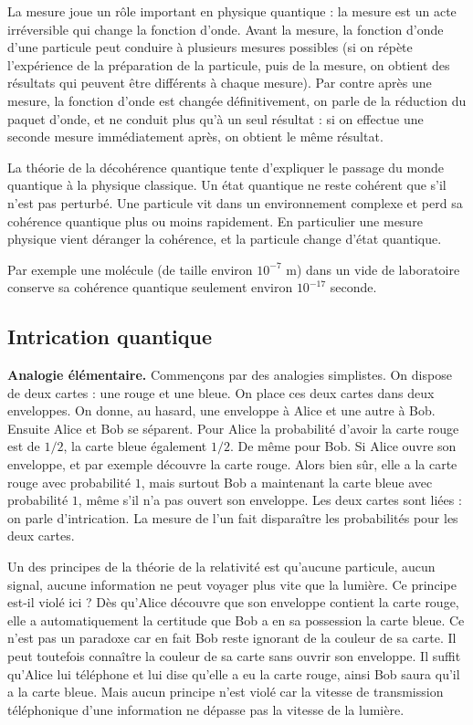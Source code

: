 \documentclass[11pt,class=report,crop=false]{standalone}
\begin{document}
La mesure joue un rôle important en physique quantique : la mesure est un acte irréversible qui change la fonction d'onde.
Avant la mesure, la fonction d'onde d'une particule peut conduire à plusieurs mesures possibles (si on répète l'expérience de la préparation de la particule, puis de la mesure, on obtient des résultats qui peuvent être différents à chaque mesure).
Par contre après une mesure, la fonction d'onde est changée définitivement, on parle de la \og{}réduction du paquet d'onde\fg{}, et ne conduit plus qu'à un seul résultat : si on effectue une seconde mesure immédiatement après, on obtient le même résultat.

La théorie de la décohérence quantique tente d'expliquer le passage du monde quantique à la physique classique.
Un état quantique ne reste \og{}cohérent\fg{} que s'il n'est pas perturbé. Une particule vit dans un environnement complexe et perd sa cohérence quantique plus ou moins rapidement. En particulier une mesure physique vient déranger la cohérence, et la particule change d'état quantique.

Par exemple une molécule (de taille environ $10^{-7}$ m) dans un vide de laboratoire conserve sa cohérence quantique seulement environ $10^{-17}$ seconde.


\subsection{Intrication quantique}


\textbf{Analogie élémentaire.}
Commençons par des analogies simplistes. On dispose de deux cartes : une rouge et une bleue. On place ces deux cartes dans deux enveloppes. On donne, au hasard, une enveloppe à Alice et une autre à Bob. Ensuite Alice et Bob se séparent. Pour Alice la probabilité d'avoir la carte rouge est de $1/2$, la carte bleue également $1/2$. De même pour Bob. Si Alice ouvre son enveloppe, et par exemple découvre la carte rouge. Alors bien sûr, elle a la carte rouge avec probabilité $1$, mais surtout Bob a maintenant la carte bleue avec probabilité $1$, même s'il n'a pas ouvert son enveloppe.
Les deux cartes sont liées : on parle d'intrication. La mesure de l'un fait disparaître les probabilités pour les deux cartes.

 
Un des principes de la théorie de la relativité est qu'aucune particule, aucun signal, aucune information ne peut voyager plus vite que la lumière. Ce principe est-il violé ici ? Dès qu'Alice découvre que son enveloppe contient la carte rouge, elle a automatiquement la certitude que Bob a en sa possession la carte bleue. Ce n'est pas un paradoxe car en fait Bob reste ignorant de la couleur de sa carte. Il peut toutefois connaître la couleur de sa carte sans ouvrir son enveloppe. Il suffit qu'Alice lui téléphone et lui dise qu'elle a eu la carte rouge, ainsi Bob saura qu'il a la carte bleue. Mais aucun principe n'est violé car la vitesse de transmission téléphonique d'une information ne dépasse pas la vitesse de la lumière.
\end{document}
